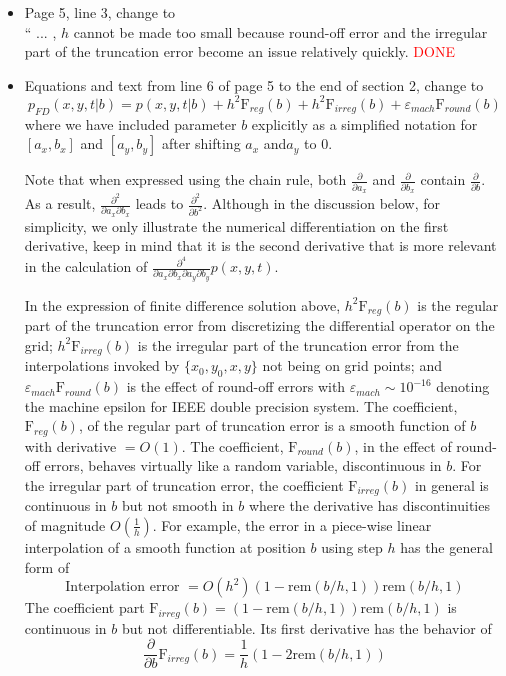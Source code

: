 \documentclass[12pt]{article}
\begin{document}
\begin{itemize}
\item Page 5, line 3, change to \\
`` ... , $h$ cannot be made too small because round-off error and the irregular part of 
the truncation error become an issue relatively quickly.
    \textcolor{red}{DONE}

\item Equations and text from line 6 of page 5 to the end of section 2, change to \\
$$p_{FD}(\left. x, y, t \right| b) = p(\left. x, y, t \right| b) 
+ h^2 \mbox{F}_{reg}(b) + h^2 \mbox{F}_{irreg}(b) + 
\varepsilon_{mach} \mbox{F}_{round}(b) $$
where we have included parameter $b $ explicitly as a simplified notation for 
$[a_x, b_x]$ and $[a_y, b_y]$ after shifting $a_x$ and$a_y$ to 0. 

Note that when expressed using the chain rule, both 
$\displaystyle \frac{\partial}{\partial a_x}$ and  $\displaystyle \frac{\partial}{\partial b_x}$
contain $\displaystyle \frac{\partial}{\partial b}$. As a result, 
$\displaystyle \frac{\partial^2 }{\partial a_x \partial b_x} $ leads to 
$\displaystyle \frac{\partial^2 }{\partial b^2} $. Although in the discussion below, 
for simplicity, we only illustrate the numerical differentiation on the first derivative, 
keep in mind that it is the second derivative that is more relevant in the calculation of 
 $\displaystyle \frac{\partial^4}{\partial a_x \partial b_x \partial a_y \partial b_y}
p(x, y, t) $. 

In the expression of finite difference solution above, 
$h^2 \mbox{F}_{reg}(b) $ is the regular part of 
the truncation error from discretizing the differential operator on the grid; 
$h^2 \mbox{F}_{irreg}(b) $ is the irregular part of the truncation error 
from the interpolations invoked by $\{x_0, y_0, x, y \}$ not being on grid points; 
and $\varepsilon_{mach} \mbox{F}_{round}(b) $ is the effect of round-off errors
with $\varepsilon_{mach} \sim 10^{-16}$ denoting the machine epsilon for 
IEEE double precision system. 
The coefficient, $\mbox{F}_{reg}(b) $, of the regular part of truncation error 
is a smooth function of $b$ with derivative $= O(1)$. 
The coefficient, $\mbox{F}_{round}(b) $, in the effect of round-off errors, 
behaves virtually like a random variable, discontinuous in $b$. 
For the irregular part of truncation error, the coefficient $\mbox{F}_{irreg}(b) $ 
in general is continuous in $b$ but not smooth in $b$ where the derivative has 
discontinuities of magnitude $O\left( \frac{1}{h} \right)$. 
For example, the error in 
a piece-wise linear interpolation of a smooth function at position $b$ using step $h$ 
has the general form of 
$$\mbox{Interpolation error } = O(h^2) (1-\mbox{rem}(b/h,1)) \mbox{rem}(b/h,1)$$ 
The coefficient part $\mbox{F}_{irreg}(b) = (1-\mbox{rem}(b/h,1)) \mbox{rem}(b/h,1) $ 
is continuous in $b$ but not differentiable. Its first derivative 
has the behavior of 
$$ \frac{\partial }{\partial b} \mbox{F}_{irreg}(b) =  \frac{1}{h} \left(1-2\mbox{rem}(b/h,1) \right)$$


\end{itemize}
\end{document}
